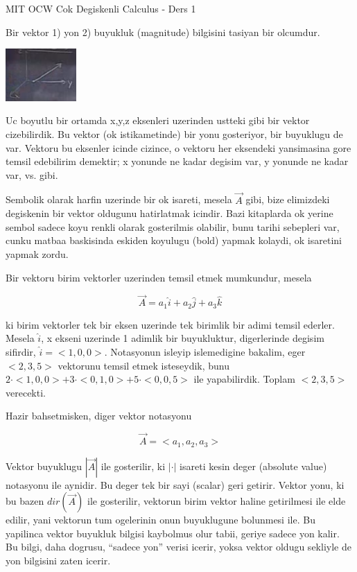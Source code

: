 \documentclass[12pt,fleqn]{article}
\begin{document}
MIT OCW Cok Degiskenli Calculus - Ders 1

Bir vektor 1) yon 2) buyukluk (magnitude) bilgisini tasiyan bir olcumdur. 

\includegraphics[height=2cm]{1_1.png}

Uc boyutlu bir ortamda x,y,z eksenleri uzerinden ustteki gibi bir vektor
cizebilirdik. Bu vektor (ok istikametinde) bir yonu gosteriyor, bir
buyuklugu de var. Vektoru bu eksenler icinde cizince, o vektoru her
eksendeki yansimasina gore temsil edebilirim demektir; x yonunde ne kadar
degisim var, y yonunde ne kadar var, vs. gibi.

Sembolik olarak harfin uzerinde bir ok isareti, mesela $\vec{A}$ gibi, bize
elimizdeki degiskenin bir vektor oldugunu hatirlatmak icindir. Bazi
kitaplarda ok yerine sembol sadece koyu renkli olarak gosterilmis olabilir,
bunu tarihi sebepleri var, cunku matbaa baskisinda eskiden koyulugu (bold)
yapmak kolaydi, ok isaretini yapmak zordu. 

Bir vektoru birim vektorler uzerinden temsil etmek mumkundur, mesela 

\[ \vec{A} = a_1 \hat{i} + a_2 \hat{j} + a_3 \hat{k} \]

ki birim vektorler tek bir eksen uzerinde tek birimlik bir adimi temsil
ederler. Mesela $\hat{i}$, x ekseni uzerinde 1 adimlik bir buyukluktur,
digerlerinde degisim sifirdir, $\hat{i} = <1,0,0>$. Notasyonun isleyip
islemedigine bakalim, eger $<2,3,5>$ vektorunu temsil etmek isteseydik,
bunu $2\cdot<1,0,0> + 3\cdot<0,1,0> + 5\cdot<0,0,5>$ ile
yapabilirdik. Toplam $<2,3,5>$ verecekti. 

Hazir bahsetmisken, diger vektor notasyonu

\[ \vec{A} = <a_1, a_2, a_3> \]

Vektor buyuklugu $|\vec{A}|$ ile gosterilir, ki $|\cdot|$ isareti kesin
deger (absolute value) notasyonu ile aynidir. Bu deger tek bir sayi
(scalar) geri getirir. Vektor yonu, ki bu bazen $dir(\vec{A})$ ile
gosterilir, vektorun birim vektor haline getirilmesi ile elde edilir, yani
vektorun tum ogelerinin onun buyuklugune bolunmesi ile. Bu yapilinca vektor
buyukluk bilgisi kaybolmus olur tabii, geriye sadece yon kalir. Bu bilgi,
daha dogrusu, ``sadece yon'' verisi icerir, yoksa vektor oldugu sekliyle de
yon bilgisini zaten icerir.
\end{document}
